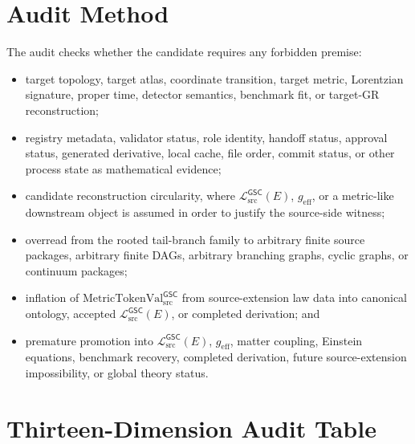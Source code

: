 \documentclass[11pt]{article}
\newcommand{\MetricTokenVal}{\mathrm{MetricTokenVal}_{\mathrm{src}}^{\mathsf{GSC}}}
\newcommand{\MetricData}{\mathcal{L}_{\mathrm{src}}^{\mathsf{GSC}}}
\newcommand{\geff}{g_{\mathrm{eff}}}
\begin{document}
\section{Audit Method}

The audit checks whether the candidate requires any forbidden premise:
\begin{itemize}[leftmargin=*]
  \item target topology, target atlas, coordinate transition, target metric,
  Lorentzian signature, proper time, detector semantics, benchmark fit, or
  target-GR reconstruction;
  \item registry metadata, validator status, role identity, handoff status,
  approval status, generated derivative, local cache, file order, commit
  status, or other process state as mathematical evidence;
  \item candidate reconstruction circularity, where \(\MetricData(E)\),
  \(\geff\), or a metric-like downstream object is assumed in order to
  justify the source-side witness;
  \item overread from the rooted tail-branch family to arbitrary finite source
  packages, arbitrary finite DAGs, arbitrary branching graphs, cyclic graphs,
  or continuum packages;
  \item inflation of \(\MetricTokenVal\) from source-extension law data into
  canonical ontology, accepted \(\MetricData(E)\), or completed derivation;
  and
  \item premature promotion into \(\MetricData(E)\), \(\geff\), matter
  coupling, Einstein equations, benchmark recovery, completed derivation,
  future source-extension impossibility, or global theory status.
\end{itemize}

\section{Thirteen-Dimension Audit Table}
\end{document}
